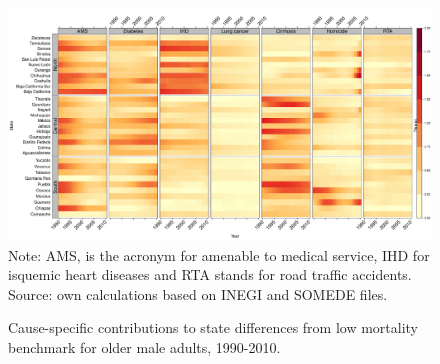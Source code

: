 \documentclass[11.5pt]{article}
\begin{document}
\begin{spacing}{1.5}
\begin{figure}[h!]
\centering
\caption{Cause-specific contributions to state differences from low mortality benchmark for older male adults, 1990-2010.}
\label{fig:e40_74_males}
\includegraphics[scale=.31]{Figures/Adult_Male_heatmap.pdf}
Note: AMS, is the acronym for amenable to medical service, IHD for isquemic heart diseases and RTA stands for road traffic accidents. Source: own calculations based on INEGI and SOMEDE files. 
\end{figure}



\end{spacing}
\end{document}
